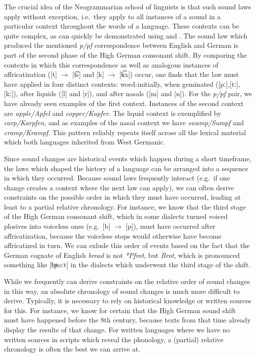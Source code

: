 The crucial idea of the Neogrammarian school of linguists is that such sound laws apply without exception, i.e.\ they apply to all instances of a sound in a particular context throughout the words of a language. These contexts can be quite complex, as can quickly be demonstrated using  and . The sound law which produced the mentioned \textit{p/pf} correspondence between English and German is part of the second phase of the High German consonant shift. By comparing the contexts in which this correspondence as well as analogous instances of affricatization ([t] $\rightarrow$ [t͡s] and [k] $\rightarrow$ [k͡x]) occur, one finds that the law must have applied in four distinct contexts: word-initially, when geminated ([pː],[tː],[kː]), after liquids ([l] and [r]), and after nasals ([m] and [n]). For the \textit{p/pf} pair, we have already seen examples of the first context. Instances of the second context are \textit{apple/Apfel} and \textit{copper/Kupfer}. The liquid context is exemplified by \textit{carp/Karpfen}, and as examples of the nasal context we have \textit{swamp/Sumpf} and \textit{cramp/Krampf}. This pattern reliably repeats itself across all the lexical material which both languages inherited from West Germanic.

Since sound changes are historical events which happen during a short timeframe, the laws which shaped the history of a language can be arranged into a sequence in which they occurred. Because sound laws frequently interact (e.g.\ if one change creates a context where the next law can apply), we can often derive constraints on the possible order in which they must have occurred, leading at least to a partial relative chronology. For instance, we know that the third stage of the High German consonant shift, which in some  dialects turned voiced plosives into voiceless ones (e.g.\ [b] $\rightarrow$ [p]), must have occurred after affricatization, because the voiceless stops would otherwise have become affricatized in turn. We can exlude this order of events based on the fact that the German cognate of English \textit{bread} is not \textit{*Pfrot}, but \textit{Brot}, which is pronounced something like [b̥ʀoːt] in the dialects which underwent the third stage of the shift.

While we frequently can derive constraints on the relative order of sound changes in this way, an absolute chronology of sound changes is much more difficult to derive. Typically, it is necessary to rely on historical knowledge or written sources for this. For instance, we know for certain that the High German sound shift must have happened before the 8th century, because  texts from that time already display the results of that change. For written languages where we have no written sources in scripts which reveal the phonology, a (partial) relative chronology is often the best we can arrive at.


